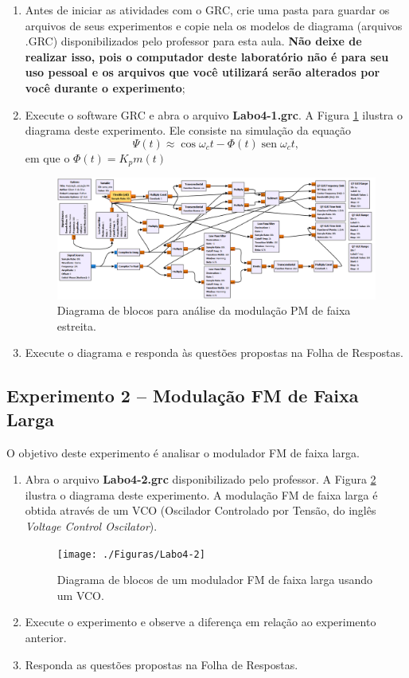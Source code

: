 \documentclass[12pt,addpoints]{exam}
\begin{document}
\begin{enumerate}
    \item Antes de iniciar as atividades com o GRC, crie uma pasta para guardar os arquivos de seus experimentos e copie nela os modelos de diagrama (arquivos .GRC) disponibilizados pelo professor para esta aula. \textbf{Não deixe de realizar isso, pois o computador deste laboratório não é para seu uso pessoal e os arquivos que você utilizará serão alterados por você durante o experimento};
    \item Execute o software GRC e abra o arquivo \textbf{Labo4-1.grc}. A Figura \ref{fig:GRC_4-1} ilustra o diagrama deste experimento. Ele consiste na simulação da equação 
\begin{equation}
    \varPsi(t) \approx \cos\omega_ct - \Phi(t)\operatorname{sen}{\omega_{c}t}, \label{eq:pmnb}
\end{equation}
em que o $\Phi(t) = K_pm(t)$
    \begin{figure}[htb]
        \centering
        \includegraphics[scale=.5]{./Figuras/Labo4-1}
        \caption{Diagrama de blocos para análise da modulação PM de faixa estreita.} 
        \label{fig:GRC_4-1}
    \end{figure}
  \item Execute o diagrama e responda às questões propostas na Folha de Respostas.
\end{enumerate}

\subsection{Experimento 2 -- Modulação FM de Faixa Larga}

O objetivo deste experimento é analisar o modulador FM de faixa larga. 

\begin{enumerate}
    \item Abra o arquivo \textbf{Labo4-2.grc} disponibilizado pelo professor. A Figura \ref{fig:GRC_4-2} ilustra o diagrama deste experimento. A modulação FM de faixa larga é obtida através de um VCO (Oscilador Controlado por Tensão, do inglês {\it Voltage Control Oscilator}).
    \begin{figure}[htb]
        \centering
        \texttt{[image: ./Figuras/Labo4-2]}
        \caption{Diagrama de blocos de um modulador FM de faixa larga usando um VCO.}
        \label{fig:GRC_4-2}
    \end{figure}
  \item Execute o experimento e observe a diferença em relação ao experimento anterior.
  \item Responda as questões propostas na Folha de Respostas.
\end{enumerate}
\end{document}
